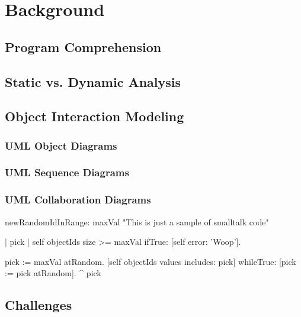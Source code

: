\chapter{Background}
\label{c:Background}

\section{Program Comprehension}

\section{Static vs. Dynamic Analysis}

\section{Object Interaction Modeling}
\subsection{UML Object Diagrams}
\subsection{UML Sequence Diagrams}
\subsection{UML Collaboration Diagrams}

\begin{smalltalk}[float=htbp,caption=Smalltalk Sample]
newRandomIdInRange: maxVal
	"This is just a sample of smalltalk code"
	
	| pick |
	self objectIds size >= maxVal ifTrue: [self error: 'Woop'].
	
	pick := maxVal atRandom.
	[self objectIds values includes: pick] 
		whileTrue: [pick := pick atRandom].
	^  pick
\end{smalltalk}

\section{Challenges}